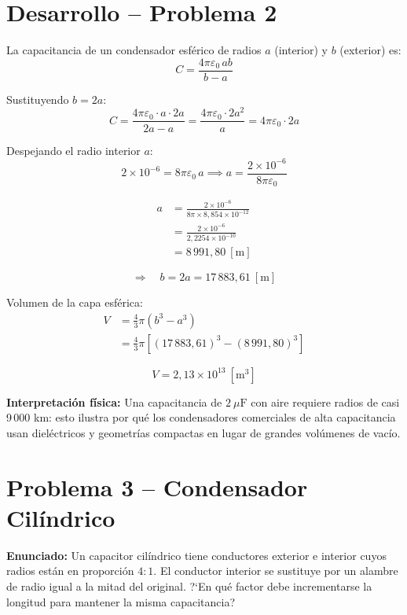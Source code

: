 \documentclass[12pt,letterpaper]{article}
\begin{document}
\newpage

\section*{Desarrollo -- Problema 2}

La capacitancia de un condensador esf\'erico de radios $a$ (interior) y $b$ (exterior) es:
\[
    C = \frac{4\pi\varepsilon_0\,ab}{b - a}
\]

Sustituyendo $b = 2a$:
\[
    C = \frac{4\pi\varepsilon_0\cdot a\cdot 2a}{2a - a} = \frac{4\pi\varepsilon_0\cdot 2a^2}{a} = 4\pi\varepsilon_0\cdot 2a
\]

Despejando el radio interior $a$:
\[
    2\times10^{-6} = 8\pi\varepsilon_0\,a
    \implies
    a = \frac{2\times10^{-6}}{8\pi\varepsilon_0}
\]

\begin{align*}
    a &= \frac{2\times10^{-6}}{8\pi \times 8{,}854\times10^{-12}}\\[6pt]
      &= \frac{2\times10^{-6}}{2{,}2254\times10^{-10}}\\[6pt]
      &= 8\,991{,}80\ [\text{m}]
\end{align*}

\[
    \Rightarrow\quad b = 2a = 17\,883{,}61\ [\text{m}]
\]

Volumen de la capa esf\'erica:
\begin{align*}
    V &= \tfrac{4}{3}\pi\left(b^3 - a^3\right)\\[6pt]
      &= \tfrac{4}{3}\pi\left[(17\,883{,}61)^3 - (8\,991{,}80)^3\right]
\end{align*}

\[
    \boxed{V = 2{,}13\times10^{13}\ [\text{m}^3]}
\]

\noindent\textbf{Interpretaci\'on f\'isica:} Una capacitancia de $2\ \mu\text{F}$ con aire requiere radios de casi 9\,000 km: esto ilustra por qu\'e los condensadores comerciales de alta capacitancia usan diel\'ectricos y geometr\'ias compactas en lugar de grandes vol\'umenes de vacío.

\newpage

\section*{Problema 3 -- Condensador Cil\'indrico}

\noindent\textbf{Enunciado:} Un capacitor cil\'indrico tiene conductores exterior e interior cuyos radios est\'an en proporci\'on $4:1$. El conductor interior se sustituye por un alambre de radio igual a la mitad del original. ?`En qu\'e factor debe incrementarse la longitud para mantener la misma capacitancia?
\end{document}
